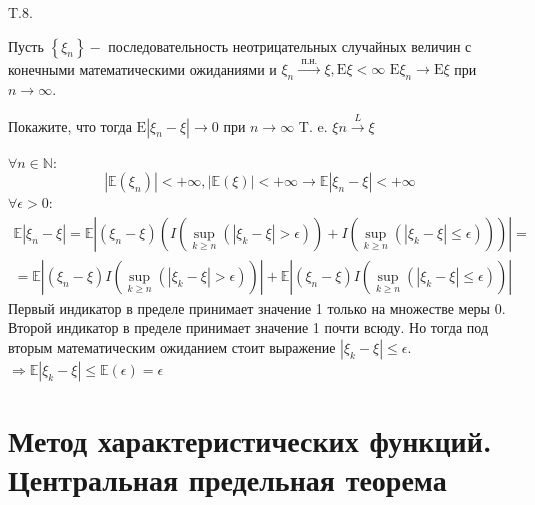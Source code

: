 \documentclass[a4paper,12pt]{article} %
\begin{document}
\begin{example} T.8. 

Пусть $\left\{\xi_{n}\right\}-$ последовательность неотрицательных случайных величин с конечными математическими ожиданиями и $\xi_{n} \stackrel{\text { п.н. }}{\rightarrow} \xi, \mathrm{E} \xi<\infty$ $\mathrm{E} \xi_{n} \rightarrow \mathrm{E} \xi$ при $n \rightarrow \infty .$ 

Покажите, что тогда $\mathrm{E}\left|\xi_{n}-\xi\right| \rightarrow 0$ при $n \rightarrow \infty$
T. e. $\xi n \stackrel{L}{\rightarrow} \xi$




$\forall n \in \mathbb{N}:$
$$
\left|\mathbb{E}\left(\xi_{n}\right)\right|<+\infty,|\mathbb{E}(\xi)|<+\infty \rightarrow \mathbb{E}\left|\xi_{n}-\xi\right|<+\infty
$$
$\forall \epsilon>0:$
$$
\begin{array}{l}
\mathbb{E}\left|\xi_{n}-\xi\right|=\mathbb{E}\left|\left(\xi_{n}-\xi\right)\left(I\left(\sup _{k \geq n}\left(\left|\xi_{k}-\xi\right|>\epsilon\right)\right)+I\left(\sup _{k \geq n}\left(\left|\xi_{k}-\xi\right| \leq \epsilon\right)\right)\right)\right|= 
\\
=\mathbb{E}\left|\left(\xi_{n}-\xi\right) I\left(\sup _{k \geq n}\left(\left|\xi_{k}-\xi\right|>\epsilon\right)\right)\right|+\mathbb{E}\left|\left(\xi_{n}-\xi\right) I\left(\sup _{k \geq n}\left(\left|\xi_{k}-\xi\right| \leq \epsilon\right)\right)\right|
\end{array}
$$
Первый индикатор в пределе принимает значение 1 только на множестве меры 0. Второй индикатор в пределе принимает значение 1 почти всюду. Но тогда под вторым математическим ожиданием стоит выражение $\left|\xi_{k}-\xi\right| \leq \epsilon$. $\Rightarrow \mathbb{E}\left|\xi_{k}-\xi\right| \leq \mathbb{E}(\epsilon)=\epsilon$









\end{example}














\section{ Метод характеристических функций. Центральная предельная теорема}
\end{document}
